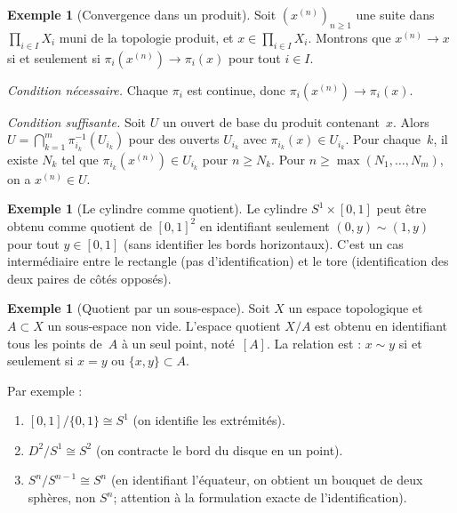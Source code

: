 \documentclass[12pt,a4paper,openany]{book}
\theoremstyle{definition}
\theoremstyle{cours}
\theoremstyle{coursnormal}
\newtheorem{exemple}[theoreme]{Exemple}
\begin{document}
\begin{exemple}[Convergence dans un produit]
\label{ex:convergence-produit}
Soit $(x^{(n)})_{n \geqslant 1}$ une suite dans $\prod_{i \in I} X_i$ muni de la
topologie produit, et $x \in \prod_{i \in I} X_i$. Montrons que
$x^{(n)} \to x$ si et seulement si $\pi_i(x^{(n)}) \to \pi_i(x)$ pour tout $i \in I$.

\emph{Condition nécessaire.} Chaque $\pi_i$ est continue, donc $\pi_i(x^{(n)}) \to \pi_i(x)$.

\emph{Condition suffisante.} Soit $U$ un ouvert de base du produit contenant~$x$.
Alors $U = \bigcap_{k=1}^{m} \pi_{i_k}^{-1}(U_{i_k})$ pour des ouverts
$U_{i_k}$ avec $\pi_{i_k}(x) \in U_{i_k}$. Pour chaque~$k$, il existe $N_k$ tel
que $\pi_{i_k}(x^{(n)}) \in U_{i_k}$ pour $n \geqslant N_k$. Pour
$n \geqslant \max(N_1, \ldots, N_m)$, on a $x^{(n)} \in U$.
\end{exemple}

\begin{exemple}[Le cylindre comme quotient]
\label{ex:cylindre-quotient}
Le cylindre $S^1 \times [0,1]$ peut être obtenu comme quotient de
$[0,1]^2$ en identifiant seulement $(0,y) \sim (1,y)$ pour tout $y \in [0,1]$
(sans identifier les bords horizontaux). C'est un cas intermédiaire entre le
rectangle (pas d'identification) et le tore (identification des deux paires de
côtés opposés).
\end{exemple}

\begin{exemple}[Quotient par un sous-espace]
\label{ex:quotient-sous-espace}
Soit $X$ un espace topologique et $A \subset X$ un sous-espace non vide. L'espace
quotient $X/A$ est obtenu en identifiant tous les points de~$A$ à un seul point,
noté~$[A]$. La relation est : $x \sim y$ si et seulement si $x = y$ ou
$\{x, y\} \subset A$.

Par exemple :
\begin{enumerate}[label=(\alph*)]
  \item $[0,1] / \{0,1\} \cong S^1$ (on identifie les extrémités).
  \item $D^2 / S^1 \cong S^2$ (on contracte le bord du disque en un point).
  \item $S^n / S^{n-1} \cong S^n$ (en identifiant l'équateur,
        on obtient un bouquet de deux sphères, non $S^n$; attention à la
        formulation exacte de l'identification).
\end{enumerate}
\end{exemple}
\end{document}
